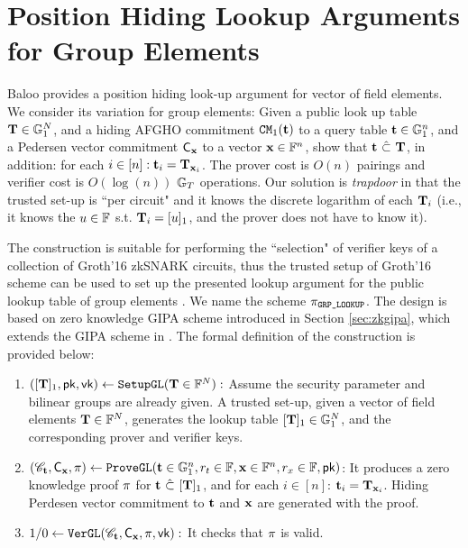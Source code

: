 \section{Position Hiding Lookup Arguments for Group Elements}
Baloo \cite{Baloo} provides a position hiding look-up argument
for vector of field elements. We consider its variation for 
group elements: Given a public look up table
${{\mathbf {T}}} \in {\mathbb{G}}_1^N$, and a hiding AFGHO commitment 
${\mathtt{CM}}_1({{\mathbf {t}}})$ to 
a query table ${{\mathbf {t}}} \in {\mathbb{G}}_1^n$, and a Pedersen vector commitment
${\mathsf{C}}_{{{\mathbf {x}}}}$ to a vector ${{\mathbf {x}}} \in \mathbb{F}^n$, show that
${{\mathbf {t}}} ~\hat{\subset}~ {{\mathbf {T}}}$, in addition:
for each $i\in [n]: {{\mathbf {t}}}_{i} = {{\mathbf {T}}}_{{{\mathbf {x}}}_i}$.
The prover cost is $O(n)$ pairings and verifier cost is
$O(\log(n))$ ${\mathbb{G}}_T$ operations. Our solution is 
{\em trapdoor} in that the trusted set-up is ``per circuit" and it knows
the discrete logarithm of each ${{\mathbf {T}}}_i$ (i.e.,
it knows the $u \in \mathbb{F}$ s.t. ${{\mathbf {T}}}_i = [u]_1$, and the
prover does not have to know it). 

The construction is suitable for performing the ``selection"
of verifier keys of a collection of Groth'16 zkSNARK circuits,
thus the trusted setup of Groth'16 scheme can be used to
set up the presented lookup argument for the public lookup table
of group elements .  We name the scheme $\pi_\texttt{GRP\_LOOKUP}$. 
The design is based on zero knowledge GIPA scheme introduced
in Section \ref{sec:zkgipa}, which extends the GIPA scheme
in \cite{Bunz21}. The formal definition of the construction
is provided below:

\begin{enumerate}
	\item $([{{\mathbf {T}}}]_1,\mathsf{pk},\mathsf{vk}) \leftarrow {\texttt{SetupGL}}({{\mathbf {T}}}\in \mathbb{F}^N):$ 
	Assume the security parameter and bilinear groups are already
	given.  A trusted set-up, given a vector of field elements 
	${{\mathbf {T}}} \in \mathbb{F}^N$, generates the lookup table $[{{\mathbf {T}}}]_1
	\in {\mathbb{G}}_1^N$, and the corresponding prover and verifier keys.


	\item $({\mathscr{C}}_{{{\mathbf {t}}}}, {\mathsf{C}}_{{{\mathbf {x}}}}, \pi)
	\leftarrow {\texttt{ProveGL}}({{\mathbf {t}}} \in {\mathbb{G}}_1^n, r_t \in \mathbb{F}, {{\mathbf {x}}}\in \mathbb{F}^n, 
		r_x \in \mathbb{F}, \mathsf{pk})$: 
	It produces a zero knowledge proof $\pi$ for
	${{\mathbf {t}}} ~\hat{\subset}~ [{{\mathbf {T}}}]_1$, and for
	each $i\in [n]$:
	${{\mathbf {t}}}_i = {{\mathbf {T}}}_{{{\mathbf {x}}}_i}$.
	Hiding Perdesen vector commitment
	to ${{\mathbf {t}}}$ and ${{\mathbf {x}}}$ are generated with the proof.

	\item $1/0 \leftarrow {\texttt{VerGL}}({\mathscr{C}}_{{{\mathbf {t}}}}, 
		{\mathsf{C}}_{{{\mathbf {x}}}}, \pi, \mathsf{vk}):$ 
	It checks that $\pi$ is valid.
\end{enumerate}
\def\hp{\hspace*{0.1in}}


